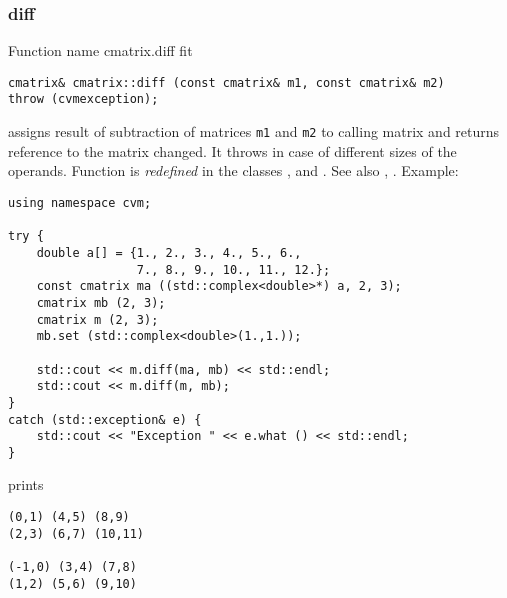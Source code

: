 \subsubsection{diff}
Function%
\pdfdest name {cmatrix.diff} fit
\begin{verbatim}
cmatrix& cmatrix::diff (const cmatrix& m1, const cmatrix& m2)
throw (cvmexception);
\end{verbatim}
assigns  result of subtraction of
matrices \verb"m1" and \verb"m2" to  calling matrix
and returns  reference to
the matrix changed.
It throws  
in case of different sizes of the operands.
Function is \emph{redefined} in the classes
,  
and .
See also ,
.
Example:
\begin{Verbatim}
using namespace cvm;

try {
    double a[] = {1., 2., 3., 4., 5., 6.,
                  7., 8., 9., 10., 11., 12.};
    const cmatrix ma ((std::complex<double>*) a, 2, 3);
    cmatrix mb (2, 3);
    cmatrix m (2, 3);
    mb.set (std::complex<double>(1.,1.));

    std::cout << m.diff(ma, mb) << std::endl;
    std::cout << m.diff(m, mb);
}
catch (std::exception& e) {
    std::cout << "Exception " << e.what () << std::endl;
}
\end{Verbatim}
prints
\begin{Verbatim}
(0,1) (4,5) (8,9)
(2,3) (6,7) (10,11)

(-1,0) (3,4) (7,8)
(1,2) (5,6) (9,10)
\end{Verbatim}
\newpage





